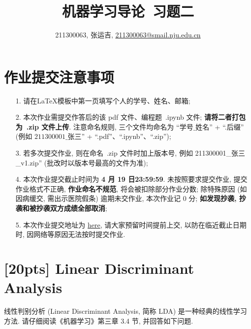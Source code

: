 \documentclass[a4paper,UTF8]{article}
\numberwithin{equation}{section}
\theoremstyle{definition}
\begin{document}
\title{机器学习导论\ 习题二}
\author{211300063, 张运吉, \href{mailto:邮箱}{211300063@smail.nju.edu.cn}}
\maketitle
\section*{作业提交注意事项}
\begin{tcolorbox}
	\begin{enumerate}
		\item[1.] 请在LaTeX模板中第一页填写个人的学号、姓名、邮箱;
		\item[2.] 本次作业需提交作答后的该 pdf 文件、编程题~.ipynb 文件; {\color{red}\textbf{请将二者打包为~.zip 文件上传}}. 注意命名规则, 三个文件均命名为 “$\text{学号}\_\text{姓名}$” + “.后缀” (例如 $\text{211300001}\_\text{张三}$” + “.pdf”、“.ipynb”、“.zip”);
		\item[3.] 若多次提交作业, 则在命名~.zip 文件时加上版本号, 例如 211300001\_张三\_v1.zip” (批改时以版本号最高的文件为准);
		\item[4.] 本次作业提交截止时间为 {\color{red}\textbf{ 4 月 19 日23:59:59}}. 未按照要求提交作业, 提交作业格式不正确, {\color{red}\textbf{作业命名不规范}}, 将会被扣除部分作业分数; 除特殊原因 (如因病缓交, 需出示医院假条) 逾期未交作业, 本次作业记 0 分; {\color{red}\textbf{如发现抄袭, 抄袭和被抄袭双方成绩全部取消}};
		\item[5.] 本次作业提交地址为 \href{https://box.nju.edu.cn/u/d/72f6f8cfff054611b6d3/}{here}, 请大家预留时间提前上交, 以防在临近截止日期时, 因网络等原因无法按时提交作业.
	\end{enumerate}
\end{tcolorbox}
\newpage


\section{[20pts] Linear Discriminant Analysis}
线性判别分析 (Linear Discriminant Analysis, 简称 LDA) 是一种经典的线性学习方法. 请仔细阅读《机器学习》第三章 3.4 节, 并回答如下问题.
\end{document}
